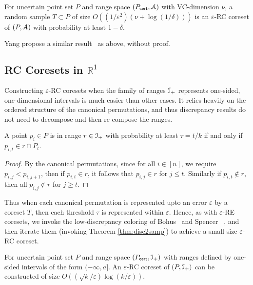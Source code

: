\documentclass[11pt]{myclass}
\newcommand{\eps}{\varepsilon}
\newcommand{\Eu}[1]{\ensuremath{\EuScript{#1}}}
\newcommand{\bl}[1]{\ensuremath{\mathbb{#1}}}
\newcommand{\cert}{\textsf{cert}}
\newcommand{\RC}{\textsf{RC}\xspace}
\newcommand{\RE}{\textsf{RE}\xspace}
\begin{document}
\begin{theorem}
\label{thm:RC-sample}
For uncertain point set $P$ and range space $(P_\cert, \Eu{A})$ with VC-dimension $\nu$, a random sample $T \subset P$ of size $O((1/\eps^2) (\nu + \log(1/\delta)))$ is an $\eps$-RC coreset of $(P,\Eu{A})$ with probability at least $1-\delta$.  
\end{theorem}

Yang \etal propose a similar result~\cite{aggregate} as above, without proof.

\subsection{\RC Coresets in $\bl{R}^1$}
Constructing $\eps$-\RC coresets when the family of ranges $\Eu{I}_+$ represents one-sided, one-dimensional intervals is much easier than other cases.  It relies heavily on the ordered structure of the canonical permutations, and thus discrepancy results do not need to decompose and then re-compose the ranges.  


\begin{lemma} \label{lem:rc-query}
A point $p_i \in P$ is in range $r \in \Eu{I}_+$ with probability at least $\tau = t/k$ if and only if $ p_{i,t} \in r \cap P_t$.
\end{lemma}

\begin{proof}
By the canonical permutations, since for all $i \in [n]$, we require $p_{i,j} < p_{i,j+1}$, then if $p_{i,t} \in r$, it follows that $p_{i,j} \in r$ for $j \leq t$.  
Similarly if $p_{i,t} \notin r$, then all $p_{i,j} \notin r$ for $j \geq t$.  
\end{proof}

Thus when each canonical permutation is represented upto an error $\eps$ by a coreset $T$, then each threshold $\tau$ is represented within $\eps$.  Hence, as with $\eps$-\RE coresets, we invoke the low-discrepancy coloring of Bohus~\cite{bohus} and Spencer \etal~\cite{spencer}, and then iterate them (invoking Theorem \ref{thm:disc2samp}) to achieve a small size $\eps$-\RC coreset.  





\begin{theorem}\label{thm:1deps-RC}
For uncertain point set $P$ and range space $(P_\cert, \Eu{I}_+)$ with ranges defined by one-sided intervals of the form $(-\infty, a]$.  
An $\eps$-\RC coreset of $(P,\Eu{I}_+)$ can be constructed of size $O((\sqrt{k}/\eps) \log (k/\eps))$.
\end{theorem}
\end{document}
